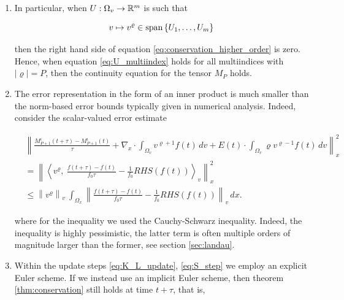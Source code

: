 \begin{remark}
    \begin{enumerate}
        \item In particular, when $U : \Omega_v \to \mathbb{R}^m$ is such that 

            \begin{equation}\label{eq:U_multiindex}
                v \mapsto v^\varrho \in \text{span} \left\{ U_1, \ldots, U_m \right\} 
            \end{equation}
            
            then the right hand side of equation \ref{eq:conservation_higher_order} 
            is zero. Hence, when equation \ref{eq:U_multiindex} holds for all 
            multiindices with $\left| \varrho \right| = P$, then the continuity 
            equation for the tensor $M_P$ holds. 
        \item The error representation in the form of an inner product is much 
            smaller than the norm-based error bounds typically given in numerical 
            analysis. Indeed, consider the scalar-valued error estimate

            \begin{equation}\label{eq:pessimistic_error}
                \begin{split}
                    &\left\| 
                        \frac{M_{P+1}^\iota (t + \tau) - M_{P+1}^\iota (t)}{\tau} 
                        + \nabla_x \cdot \int_{\Omega_v} v^{\varrho + 1} f(t) \,dv 
                        + E(t) \cdot \int_{\Omega_v} \varrho v^{\varrho - 1} f(t) \,dv
                    \right\|_x^2 \\ 
                    &= \left\| 
                        \left\langle 
                        v^\varrho,\ 
                        \frac{f(t + \tau) - f(t)}{f_0 \tau} - \frac{1}{f_0} RHS (f(t))
                        \right\rangle_v 
                     \right\|_x^2 \\ 
                    &\leq \left\| 
                        v^\varrho
                    \right\|_v \ 
                    \int_{\Omega_x} \left\| \frac{f(t + \tau) - f(t)}{f_0 \tau} - \frac{1}{f_0} RHS (f(t)) \right\|_v \,dx . 
                \end{split}
            \end{equation}

            where for the inequality we used the Cauchy-Schwarz inequality. 
            Indeed, the inequality is highly pessimistic, the latter term is 
            often multiple orders of magnitude larger than the former, see 
            section \ref{sec:landau}. 
        \item Within the update steps \ref{eq:K_L_update}, \ref{eq:S_step} we 
            employ an explicit Euler scheme. If we instead use an implicit 
            Euler scheme, then theorem \ref{thm:conservation} still holds 
            at time $t + \tau$, that is, 


\end{enumerate}
\end{remark}
